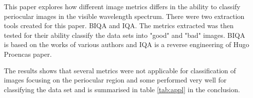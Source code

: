 This paper explores how different image metrics differs in the ability 
to classify periocular images in the visible wavelength spectrum.  There 
were two extraction tools created for this paper. BIQA\cite{biqa} and
IQA\cite{iqa}.  The metrics extracted was then tested for their ability classify
the data sets into "good" and "bad" images.  BIQA is based on the works of
various authors and IQA is a reverse engineering of Hugo Proencas 
paper\cite{hugo}.

The results shows that several metrics were not applicable for classification of
images focusing on the periocular region and some performed very well for
classifying the data set and is summarised in table \ref{tab:appl} in the
conclusion.
